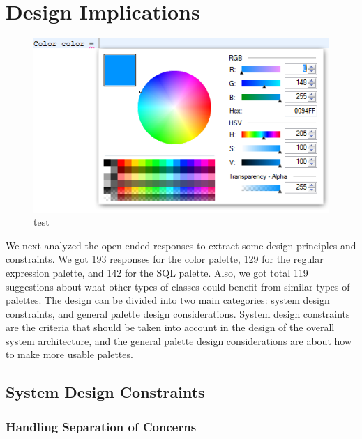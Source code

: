 \documentclass[conference]{IEEEtran}
\begin{document}


\section{Design Implications}
\begin{figure}[b]
  \includegraphics[scale=.5]{color-palette.png}
  \caption{test}
\end{figure}

We next analyzed the open-ended responses to extract some design principles and constraints. We got 193 responses for the color palette, 129 for the regular expression palette, and 142 for the SQL palette. Also, we got total 119 suggestions about what other types of classes could benefit from similar types of palettes. The design can be divided into two main categories: system design constraints, and general palette design considerations. System design constraints are the criteria that should be taken into account in the design of the overall system architecture, and the general palette design considerations are about how to make more usable palettes.

\subsection{System Design Constraints}

\subsubsection{Handling Separation of Concerns}
\end{document}
